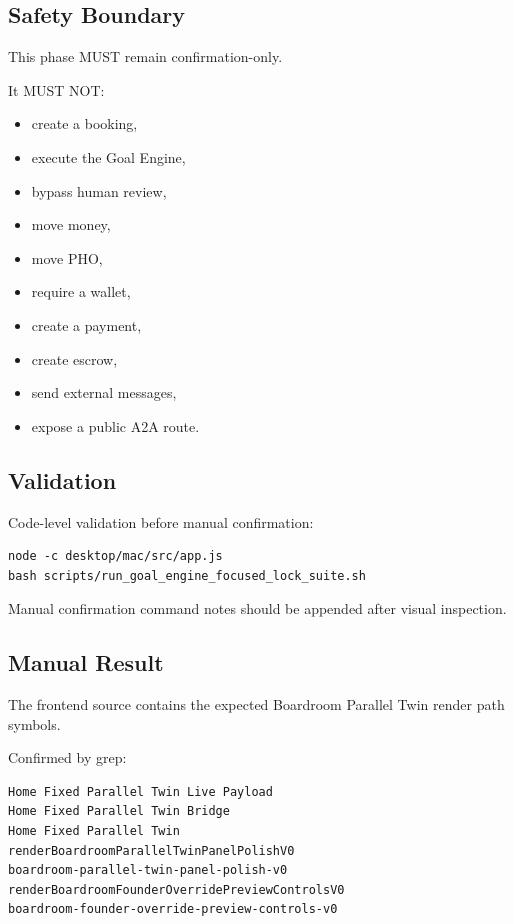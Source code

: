 \subsection{Safety Boundary}

This phase MUST remain confirmation-only.

It MUST NOT:

\begin{itemize}
  \item create a booking,
  \item execute the Goal Engine,
  \item bypass human review,
  \item move money,
  \item move PHO,
  \item require a wallet,
  \item create a payment,
  \item create escrow,
  \item send external messages,
  \item expose a public A2A route.
\end{itemize}

\subsection{Validation}

Code-level validation before manual confirmation:

\begin{verbatim}
node -c desktop/mac/src/app.js
bash scripts/run_goal_engine_focused_lock_suite.sh
\end{verbatim}

Manual confirmation command notes should be appended after visual inspection.

\subsection{Manual Result}

The frontend source contains the expected Boardroom Parallel Twin render path symbols.

Confirmed by grep:

\begin{verbatim}
Home Fixed Parallel Twin Live Payload
Home Fixed Parallel Twin Bridge
Home Fixed Parallel Twin
renderBoardroomParallelTwinPanelPolishV0
boardroom-parallel-twin-panel-polish-v0
renderBoardroomFounderOverridePreviewControlsV0
boardroom-founder-override-preview-controls-v0
\end{verbatim}

